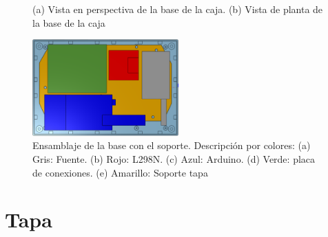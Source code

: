 \newpage

\begin{figure}[htpb]%
    \centering 
    \hspace{10pt}%
    \caption{(a) Vista en perspectiva de la base de la caja. (b) Vista de planta de la base de la caja}
    \label{fig:cajabase} 
\end{figure} 


\begin{figure}[hbtp]
    \centering
    \includegraphics[width=0.5\textwidth]{04-caja/ensamblajebase.png}
    \caption{Ensamblaje de la base con el soporte. Descripción por colores: (a) Gris: Fuente. (b) Rojo: L298N. (c) Azul: Arduino. (d) Verde: placa de conexiones. (e) Amarillo: Soporte tapa}
    \label{fig:ensamblajebase}
    \end{figure}

\section{Tapa}

